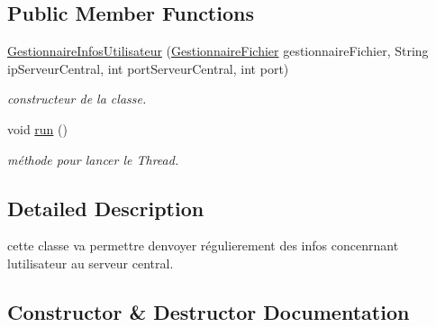 \subsection*{Public Member Functions}
\begin{DoxyCompactItemize}
\item 
\hyperlink{classterminalClient_1_1GestionnaireInfosUtilisateur_a8f2c5556445a2c0bcb812234d1026b49}{Gestionnaire\+Infos\+Utilisateur} (\hyperlink{classterminalClient_1_1GestionnaireFichier}{Gestionnaire\+Fichier} gestionnaire\+Fichier, String ip\+Serveur\+Central, int port\+Serveur\+Central, int port)
\begin{DoxyCompactList}\small\item\em constructeur de la classe. \end{DoxyCompactList}\item 
\mbox{\label{classterminalClient_1_1GestionnaireInfosUtilisateur_ad1e9e354a68f58057d1104bd7d4cbdf5}} 
void \hyperlink{classterminalClient_1_1GestionnaireInfosUtilisateur_ad1e9e354a68f58057d1104bd7d4cbdf5}{run} ()
\begin{DoxyCompactList}\small\item\em méthode pour lancer le Thread. \end{DoxyCompactList}\end{DoxyCompactItemize}


\subsection{Detailed Description}
cette classe va permettre d\textquotesingle{}envoyer régulierement des infos concenrnant l\textquotesingle{}utilisateur au serveur central. 

\subsection{Constructor \& Destructor Documentation}
\mbox{\label{classterminalClient_1_1GestionnaireInfosUtilisateur_a8f2c5556445a2c0bcb812234d1026b49}} 
